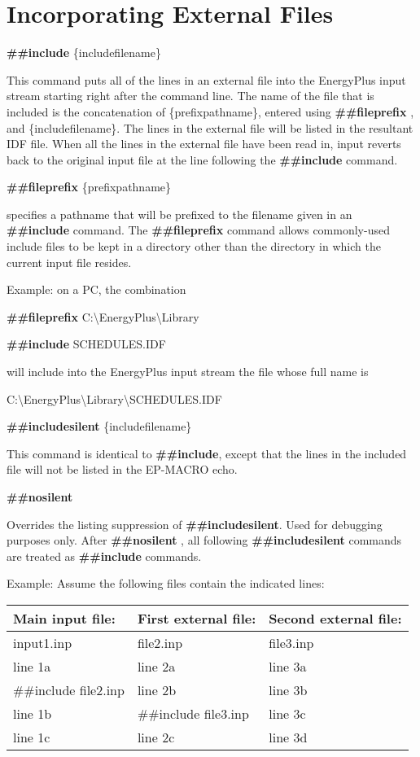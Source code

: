 \section{Incorporating External Files}\label{incorporating-external-files}

\textbf{\#\#include} \{includefilename\}

This command puts all of the lines in an external file into the EnergyPlus input stream starting right after the command line. The name of the file that is included is the concatenation of \{prefixpathname\}, entered using \textbf{\#\#fileprefix} , and \{includefilename\}. The lines in the external file will be listed in the resultant IDF file. When all the lines in the external file have been read in, input reverts back to the original input file at the line following the \textbf{\#\#include} command.

\textbf{\#\#fileprefix} \{prefixpathname\}

specifies a pathname that will be prefixed to the filename given in an \textbf{\#\#include} command. The \textbf{\#\#fileprefix} command allows commonly-used include files to be kept in a directory other than the directory in which the current input file resides.

Example: on a PC, the combination

\textbf{\#\#fileprefix} C:\textbackslash{}EnergyPlus\textbackslash{}Library

\textbf{\#\#include} SCHEDULES.IDF

will include into the EnergyPlus input stream the file whose full name is

C:\textbackslash{}EnergyPlus\textbackslash{}Library\textbackslash{}SCHEDULES.IDF

\textbf{\#\#includesilent} \{includefilename\}

This command is identical to \textbf{\#\#include}, except that the lines in the included file will not be listed in the EP-MACRO echo.

\textbf{\#\#nosilent}

Overrides the listing suppression of \textbf{\#\#includesilent}. Used for debugging purposes only. After \textbf{\#\#nosilent} , all following \textbf{\#\#includesilent} commands are treated as \textbf{\#\#include} commands.

Example: Assume the following files contain the indicated lines:

\begin{longtable}[c]{@{}lll@{}}
\toprule 
Main input file: & First external file: & Second external file: \tabularnewline \midrule
\endhead
input1.inp & file2.inp & file3.inp \tabularnewline
line 1a & line 2a & line 3a \tabularnewline
\#\#include file2.inp & line 2b & line 3b \tabularnewline
line 1b & \#\#include file3.inp & line 3c \tabularnewline
line 1c & line 2c & line 3d \tabularnewline
\bottomrule
\end{longtable}

